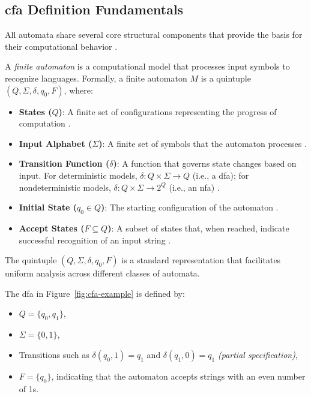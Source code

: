 \subsection{\acrshort{cfa} Definition Fundamentals}
\label{subsec:automata-definition-fundamentals}
All automata share several core structural components that provide the basis for their computational behavior \cite{hopcroft2006introduction, chomsky1956three}.

\begin{definition}
\label{def:finite-automaton}
A \textit{finite automaton} is a computational model that processes input symbols to recognize languages. Formally, a finite automaton $M$ is a quintuple $(Q, \Sigma, \delta, q_0, F)$, where:
\begin{itemize}
    \item \textbf{States ($Q$)}: A finite set of configurations representing the progress of computation \cite{hopcroft2006introduction}.
    \item \textbf{Input Alphabet ($\Sigma$)}: A finite set of symbols that the automaton processes \cite{hopcroft2006introduction}.
    \item \textbf{Transition Function ($\delta$)}: A function that governs state changes based on input. For deterministic models, $\delta: Q \times \Sigma \to Q$ (i.e., a \gls{dfa}); for nondeterministic models, $\delta: Q \times \Sigma \to 2^Q$ (i.e., an \gls{nfa}) \cite{chomsky1956three, hopcroft2006introduction}.
    \item \textbf{Initial State ($q_0 \in Q$)}: The starting configuration of the automaton \cite{hopcroft2006introduction}.
    \item \textbf{Accept States ($F \subseteq Q$)}: A subset of states that, when reached, indicate successful recognition of an input string \cite{hopcroft2006introduction}.
\end{itemize}
\end{definition}

\begin{remark}
The quintuple $(Q, \Sigma, \delta, q_0, F)$ is a standard representation that facilitates uniform analysis across different classes of automata.
\end{remark}

\begin{example}
The \gls{dfa} in Figure~\ref{fig:cfa-example} is defined by:
\begin{itemize}
    \item $Q = \{q_0, q_1\}$,
    \item $\Sigma = \{0, 1\}$,
    \item Transitions such as $\delta(q_0, 1) = q_1$ and $\delta(q_1, 0) = q_1$ \textit{(partial specification)},
    \item $F = \{q_0\}$, indicating that the automaton accepts strings with an even number of 1s.
\end{itemize}
\end{example}

